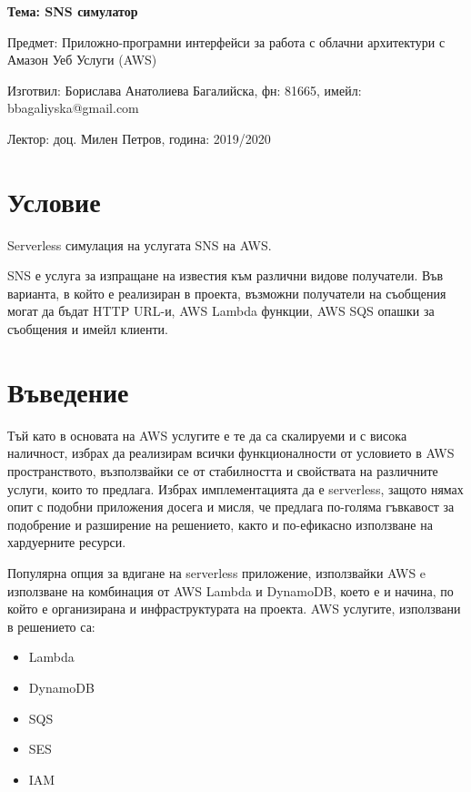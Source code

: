 \documentclass[12pt]{article}
\begin{document}
	\begin{center}
        \LARGE{\textbf{Тема: SNS симулатор}}
        
        \bigskip
        \Large{Предмет: Приложно-програмни интерфейси за работа с облачни архитектури с Амазон Уеб Услуги (AWS)}
        
        \medskip
        \Large{Изготвил: Борислава Анатолиева Багалийска, фн: 81665, имейл: bbagaliyska@gmail.com}
        
        \medskip
        \Large{Лектор: доц. Милен Петров, година: 2019/2020}
        
        \bigskip
	\end{center}
    
    
    \tableofcontents
    \bigskip
    \bigskip
    \newpage
  
\section{Условие} 

\noindent Serverless симулация на услугата SNS на AWS.

\medskip


\noindent SNS е услуга за изпращане на известия към различни видове получатели. 
Във варианта, в който е реализиран в проекта, възможни получатели на съобщения
могат да бъдат HTTP URL-и, AWS Lambda функции, AWS SQS опашки за съобщения и
имейл клиенти.

\section{Въведение}

Тъй като в основата на AWS услугите е те да са скалируеми и с висока наличност,
избрах да реализирам всички функционалности от условието в AWS пространството, 
възползвайки се от стабилността и свойствата на различните услуги, които то предлага.
Избрах имплементацията да е serverless, защото нямах опит с подобни приложения досега 
и мисля, че предлага по-голяма гъвкавост за подобрение и разширение на решението, както
и по-ефикасно използване на хардуерните ресурси.

\noindent Популярна опция за вдигане на serverless приложение, използвайки AWS e използване на
комбинация от AWS Lambda и DynamoDB, което е и начина, по който е организирана и инфраструктурата
на проекта. AWS услугите, използвани в решението са:

\begin{itemize}
    \item Lambda
    
    \item DynamoDB
    
    \item SQS
    
    \item SES
    
    \item IAM
\end{itemize}
\end{document}
